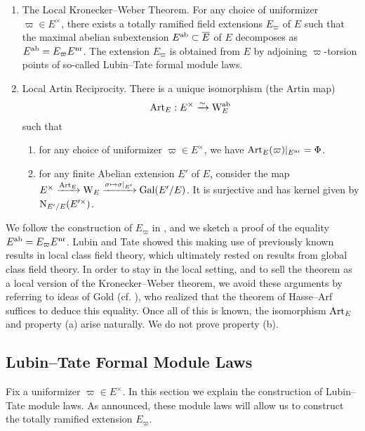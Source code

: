 \documentclass[../main.tex]{subfiles}
\begin{document}
\begin{thm}\label{thm:LocalKroneckerWeber} \leavevmode
  \vspace{-0.8em}
  \begin{enumerate}
    \item \textnormal{The Local Kronecker--Weber Theorem.} For any choice of uniformizer $\varpi \in E^\times$, there exists a 
      totally ramified field extensions $E_\varpi$ of $E$ such that 
      the maximal abelian subextension $E^{\mathrm{ab}} \subset \overline E$ of $E$
      decomposes as $E^{\mathrm{ab}} = E_\varpi E^{\mathrm{nr}}$. The extension 
      $E_\varpi$ is obtained from $E$ by adjoining $\varpi$-torsion points of so-called
      Lubin--Tate formal module laws. 
    \item \textnormal{Local Artin Reciprocity.} There is a unique isomorphism
      (the Artin map)
      \begin{equation*}
        \mathrm{Art}_E: E^\times \xrightarrow{\sim} \mathrm W_E^{\mathrm{ab}}
      \end{equation*}
      such that 
      \begin{enumerate}
        \item for any choice of uniformizer $\varpi \in E^\times$, we have
          $\mathrm{Art}_E(\varpi)|_{E^{\mathrm{nr}}} = \Phi$.
        \item for any finite Abelian extension $E'$ of $E$, consider the
          map $E^\times \xrightarrow{\mathrm{Art}_E} \mathrm W_E \xrightarrow{\sigma \mapsto
          \sigma|_{E'}} \operatorname{Gal}(E'/E)$. It is surjective and has kernel given by
          $\mathrm{N}_{E'/E}(E'^\times)$. 
      \end{enumerate}
  \end{enumerate}
\end{thm}

We follow the construction of $E_\varpi$ in \cite{LubinTateFormalMult}, and we sketch
a proof of the equality $E^{\mathrm{ab}} = E_\varpi E^{\mathrm{nr}}$. Lubin and Tate showed this
making use of previously known results in local class field theory, which ultimately
rested on results from global class field theory. 
In order to stay in the local setting, and to sell the theorem as a
local version of the Kronecker--Weber theorem,
we avoid these arguments by referring to ideas of Gold (cf.
\cite{gold1981local}), who realized that the theorem of Hasse--Arf
suffices to deduce this equality. 
Once all of this is known, the isomorphism $\mathrm{Art}_E$ and property
(a) arise naturally. We do not prove property (b).

\subsection{Lubin--Tate Formal Module Laws} %
\label{sub:Lubin--Tate Formal Module Laws}
Fix a uniformizer $\varpi \in E^\times$. In this section we explain the construction
of Lubin--Tate module laws. As announced, these module laws will allow us to
construct the totally ramified extension $E_\varpi$.
\end{document}
